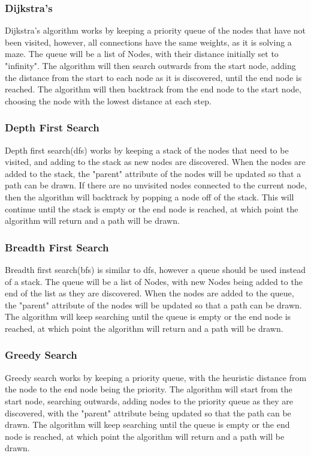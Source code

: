 \documentclass[titlepage]{article}
\begin{document}
\subsubsection{Dijkstra's}
Dijkstra's algorithm works by keeping a priority queue of the nodes that have not been visited, however, all connections have the same weights, as it is solving a maze. The queue will be a list of Nodes, with their distance initially set to "infinity". The algorithm will then search outwards from the start node, adding the distance from the start to each node as it is discovered, until the end node is reached. The algorithm will then backtrack from the end node to the start node, choosing the node with the lowest distance at each step.

\subsubsection{Depth First Search}
Depth first search(dfs) works by keeping a stack of the nodes that need to be visited, and adding to the stack as new nodes are discovered. When the nodes are added to the stack, the "parent" attribute of the nodes will be updated so that a path can be drawn. If there are no unvisited nodes connected to the current node, then the algorithm will backtrack by popping a node off of the stack. This will continue until the stack is empty or the end node is reached, at which point the algorithm will return and a path will be drawn.

\subsubsection{Breadth First Search}
Breadth first search(bfs) is similar to dfs, however a queue should be used instead of a stack. The queue will be a list of Nodes, with new Nodes being added to the end of the list as they are discovered. When the nodes are added to the queue, the "parent" attribute of the nodes will be updated so that a path can be drawn. The algorithm will keep searching until the queue is empty or the end node is reached, at which point the algorithm will return and a path will be drawn.

\subsubsection{Greedy Search}
Greedy search works by keeping a priority queue, with the heuristic distance from the node to the end node being the priority. The algorithm will start from the start node, searching outwards, adding nodes to the priority queue as they are discovered, with the "parent" attribute being updated so that the path can be drawn. The algorithm will keep searching until the queue is empty or the end node is reached, at which point the algorithm will return and a path will be drawn.
\end{document}
